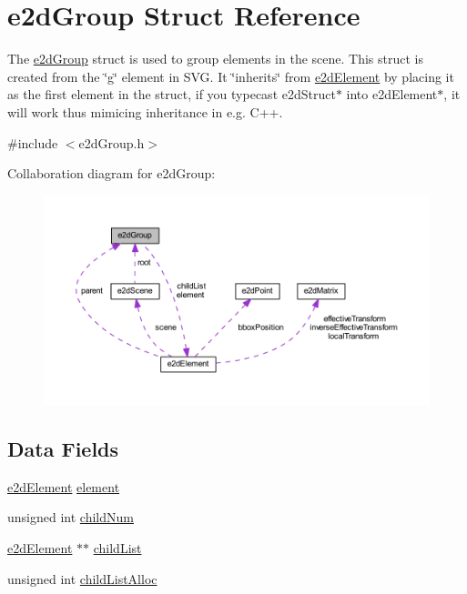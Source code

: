 \hypertarget{structe2dGroup}{\section{e2d\-Group Struct Reference}
\label{structe2dGroup}
}


The \hyperlink{structe2dGroup}{e2d\-Group} struct is used to group elements in the scene. This struct is created from the \char`\"{}g\char`\"{} element in S\-V\-G. It \char`\"{}inherits\char`\"{} from \hyperlink{structe2dElement}{e2d\-Element} by placing it as the first element in the struct, if you typecast e2d\-Struct$\ast$ into e2d\-Element$\ast$, it will work thus mimicing inheritance in e.\-g. C++.  




{\ttfamily \#include $<$e2d\-Group.\-h$>$}



Collaboration diagram for e2d\-Group\-:
\nopagebreak
\begin{figure}[H]
\begin{center}
\leavevmode
\includegraphics[width=350pt]{structe2dGroup__coll__graph}
\end{center}
\end{figure}
\subsection*{Data Fields}
\begin{DoxyCompactItemize}
\item 
\hyperlink{structe2dElement}{e2d\-Element} \hyperlink{structe2dGroup_a55bc7a3a0af41fba9e5b91f390c5928c}{element}
\item 
unsigned int \hyperlink{structe2dGroup_a0af3697c2c9df6ed0ddd340cded35d65}{child\-Num}
\item 
\hyperlink{structe2dElement}{e2d\-Element} $\ast$$\ast$ \hyperlink{structe2dGroup_a55f6dde874716dc99dcd270fc0999a01}{child\-List}
\item 
unsigned int \hyperlink{structe2dGroup_a9c89d7cf35b835ef1917855c78a79cc5}{child\-List\-Alloc}
\end{DoxyCompactItemize}


